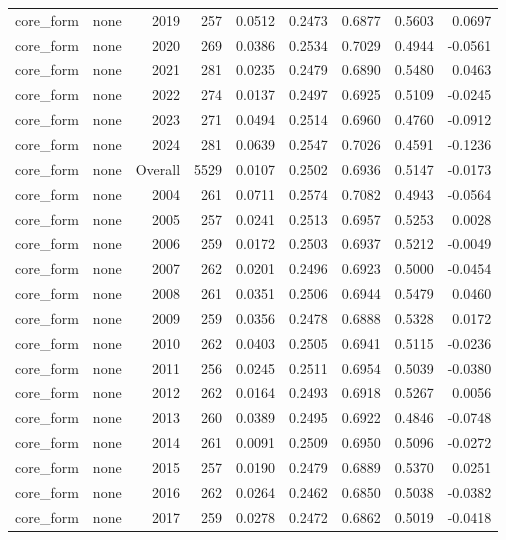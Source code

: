 \begin{table}[t]
\begin{tabular}{@{} l l r r r r r r r @{} }
      core\_form & none & 2019 & 257 & 0.0512 & 0.2473 & 0.6877 & 0.5603 & 0.0697 \\
      core\_form & none & 2020 & 269 & 0.0386 & 0.2534 & 0.7029 & 0.4944 & -0.0561 \\
      core\_form & none & 2021 & 281 & 0.0235 & 0.2479 & 0.6890 & 0.5480 & 0.0463 \\
      core\_form & none & 2022 & 274 & 0.0137 & 0.2497 & 0.6925 & 0.5109 & -0.0245 \\
      core\_form & none & 2023 & 271 & 0.0494 & 0.2514 & 0.6960 & 0.4760 & -0.0912 \\
      core\_form & none & 2024 & 281 & 0.0639 & 0.2547 & 0.7026 & 0.4591 & -0.1236 \\
      core\_form & none & Overall & 5529 & 0.0107 & 0.2502 & 0.6936 & 0.5147 & -0.0173 \\
      core\_form & none & 2004 & 261 & 0.0711 & 0.2574 & 0.7082 & 0.4943 & -0.0564 \\
      core\_form & none & 2005 & 257 & 0.0241 & 0.2513 & 0.6957 & 0.5253 & 0.0028 \\
      core\_form & none & 2006 & 259 & 0.0172 & 0.2503 & 0.6937 & 0.5212 & -0.0049 \\
      core\_form & none & 2007 & 262 & 0.0201 & 0.2496 & 0.6923 & 0.5000 & -0.0454 \\
      core\_form & none & 2008 & 261 & 0.0351 & 0.2506 & 0.6944 & 0.5479 & 0.0460 \\
      core\_form & none & 2009 & 259 & 0.0356 & 0.2478 & 0.6888 & 0.5328 & 0.0172 \\
      core\_form & none & 2010 & 262 & 0.0403 & 0.2505 & 0.6941 & 0.5115 & -0.0236 \\
      core\_form & none & 2011 & 256 & 0.0245 & 0.2511 & 0.6954 & 0.5039 & -0.0380 \\
      core\_form & none & 2012 & 262 & 0.0164 & 0.2493 & 0.6918 & 0.5267 & 0.0056 \\
      core\_form & none & 2013 & 260 & 0.0389 & 0.2495 & 0.6922 & 0.4846 & -0.0748 \\
      core\_form & none & 2014 & 261 & 0.0091 & 0.2509 & 0.6950 & 0.5096 & -0.0272 \\
      core\_form & none & 2015 & 257 & 0.0190 & 0.2479 & 0.6889 & 0.5370 & 0.0251 \\
      core\_form & none & 2016 & 262 & 0.0264 & 0.2462 & 0.6850 & 0.5038 & -0.0382 \\
      core\_form & none & 2017 & 259 & 0.0278 & 0.2472 & 0.6862 & 0.5019 & -0.0418 \\

\end{tabular}
\end{table}
